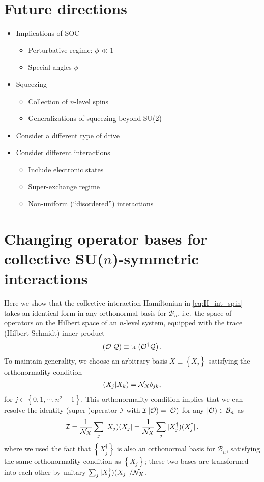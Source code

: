 \documentclass[nofootinbib,notitlepage,11pt]{revtex4-2}
\newcommand{\f}[2]{\dfrac{#1}{#2}} %
\newcommand{\p}[1]{\left(#1\right)} %
\renewcommand{\set}[1]{\left\{#1\right\}} %
\newcommand{\1}{\mathds{1}}
\newcommand{\B}{\mathcal{B}}
\newcommand{\I}{\mathcal{I}}
\newcommand{\N}{\mathcal{N}}
\renewcommand{\O}{\mathcal{O}}
\newcommand{\Q}{\mathcal{Q}}
\def\obra#1{\mathinner{({#1}|}}
\def\oket#1{\mathinner{|{#1})}}
\def\obk#1{\mathinner{({#1})}}
\def\oop#1#2{\oket{#1}\!\obra{#2}}
\begin{document}
\section{Future directions}

\begin{itemize}
\item Implications of SOC
  \begin{itemize}
  \item Perturbative regime: $\phi\ll1$
  \item Special angles $\phi$
  \end{itemize}
\item Squeezing
  \begin{itemize}
  \item Collection of $n$-level spins
  \item Generalizations of squeezing beyond SU(2)
  \end{itemize}
\item Consider a different type of drive
\item Consider different interactions
  \begin{itemize}
  \item Include electronic states
  \item Super-exchange regime
  \item Non-uniform (``disordered'') interactions
  \end{itemize}
\end{itemize}



\appendix

\section{Changing operator bases for collective SU($n$)-symmetric
  interactions}
\label{sec:changing_bases}

Here we show that the collective interaction Hamiltonian in
\eqref{eq:H_int_spin} takes an identical form in any orthonormal basis
for $\B_n$, i.e.~the space of operators on the Hilbert space of an
$n$-level system, equipped with the trace (Hilbert-Schmidt) inner
product
\begin{align}
  \obk{\O|\Q} \equiv \tr\p{\O^\dag \Q}.
\end{align}
To maintain generality, we choose an arbitrary basis
$X\equiv\set{X_j}$ satisfying the orthonormality condition
\begin{align}
  \obk{X_j|X_k} = \N_X \delta_{jk},
\end{align}
for $j\in\set{0,1,\cdots,n^2-1}$.  This orthonormality condition
implies that we can resolve the identity (super-)operator $\I$ with
$\I\oket{\O}=\oket{\O}$ for any $\oket\O\in\B_n$ as
\begin{align}
  \I = \f1{\N_X} \sum_j \oop{X_j}{X_j}
  = \f1{\N_X} \sum_j \oop{X_j^\dag}{X_j^\dag},
\end{align}
where we used the fact that $\set{X_j^\dag}$ is also an orthonormal
basis for $\B_n$, satisfying the same orthonormality condition as
$\set{X_j}$; these two bases are transformed into each other by
unitary $\sum_j\oop{X_j^\dag}{X_j}/\N_X$.
\end{document}
